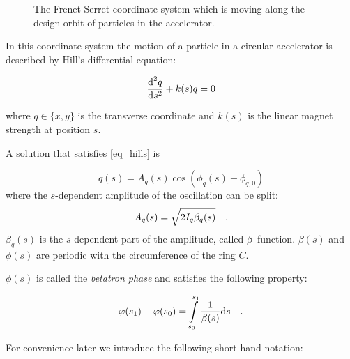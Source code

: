\begin{figure}[h]
    \caption{
        The Frenet-Serret coordinate system which is moving along the design orbit of particles
        in the accelerator.
    }
    \label{fig_frenet_serret}
\end{figure}

In this coordinate system the motion of a particle in a circular accelerator is described by Hill's
differential equation:

\begin{equation}
    \frac{\text{d}^2 q}{\text{d} s^2} + k(s)q = 0
    \label{eq_hills}
\end{equation}

where $q \in \{x,y\}$ is the transverse coordinate and $k(s)$ is the linear magnet strength at
position $s$.

A solution that satisfies \eqref{eq_hills} is

\begin{equation}
    q(s) = A_q(s) \cos\left(\phi_q(s) + \phi_{q,0} \right)
    \label{eq_betatron_osc}
\end{equation}
where the $s$-dependent amplitude of the oscillation can be split:
\begin{equation}
    A_q(s) = \sqrt{2I_q \beta_q(s)}
    \quad .
    \label{eq_betatron_ampl}
\end{equation}
$\beta_q(s)$ is the $s$-dependent part of the amplitude, called $\beta$~function. $\beta(s)$ and 
$\phi(s)$ are periodic with the circumference of the ring $C$.

$\phi(s)$ is called the \emph{betatron phase} and satisfies the following property:

\begin{equation}
    \varphi(s_1) - \varphi(s_0) = \int\limits_{s_0}^{s_1} \frac{1}{\beta(s)}\text{d} s
    \quad .
    \label{eq_phase}
\end{equation}

For convenience later we introduce the following short-hand notation:

